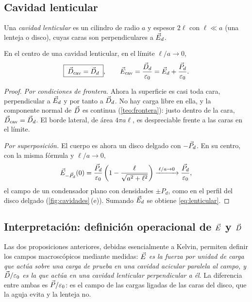\subsection{Cavidad lenticular}\label{sec:lenticular}

\begin{definicion}\label{def:lenticular}
Una \emph{cavidad lenticular} es un cilindro de radio $a$ y espesor $2\ell$ con $\ell\ll a$ (una lenteja o disco), cuyas caras son
perpendiculares a $\vec E_d$.
\end{definicion}

\begin{proposicion}\label{prop:lenticular}
En el centro de una cavidad lenticular, en el límite $\ell/a\to0$,
\begin{equation}\label{eq:lenticular}
  \boxed{\;\vec D_{\mathrm{cav}}=\vec D_d\;},\qquad \vec E_{\mathrm{cav}}=\frac{\vec D_d}{\varepsilon_0}=\vec E_d+\frac{\vec P_d}{\varepsilon_0} .
\end{equation}
\end{proposicion}

\begin{proof}
\emph{Por condiciones de frontera.} Ahora la superficie es casi toda cara, perpendicular a $\vec E_d$ y por tanto a $\vec D_d$. No hay carga libre
en ella, y la componente normal de $\vec D$ es continua (\cref{teo:frontera}): justo dentro de la cara, $\vec D_{\mathrm{cav}}=\vec D_d$. El borde lateral, de
área $4\pi a\ell$, es despreciable frente a las caras en el límite.

\emph{Por superposición.} El cuerpo es ahora un disco delgado con $-\vec P_d$. En su centro, con la misma fórmula y $\ell/a\to0$,
\[
  \vec E_{-\vec P_d}(0)=\frac{\vec P_d}{\varepsilon_0}\left(1-\frac{\ell}{\sqrt{a^2+\ell^2}}\right)\xrightarrow{\;\ell/a\to0\;}\frac{\vec P_d}{\varepsilon_0},
\]
el campo de un condensador plano con densidades $\pm P_d$, como en el perfil del disco delgado (\cref{fig:cavidades}\,(e)). Sumando
$\vec E_d$ se obtiene \eqref{eq:lenticular}.
\end{proof}

\subsection{Interpretación: definición operacional de $\vec E$ y $\vec D$}\label{sec:cav-interpretacion}

Las dos proposiciones anteriores, debidas esencialmente a Kelvin, permiten definir los campos macroscópicos mediante
medidas: \emph{$\vec E$ es la fuerza por unidad de carga que actúa sobre una carga de prueba en una cavidad acicular
paralela al campo, y $\vec D/\varepsilon_0$ es la que actúa en una cavidad lenticular perpendicular a él}. La diferencia entre ambas
es $\vec P/\varepsilon_0$: es el campo de las cargas ligadas de las caras del disco, que la aguja evita y la lenteja no.

